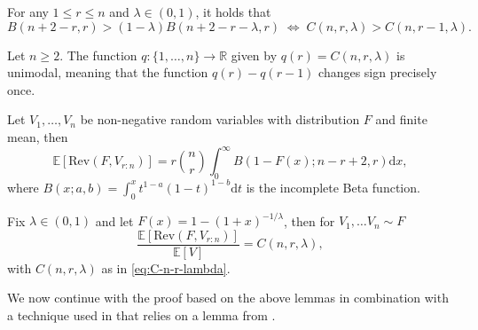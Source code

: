\documentclass[11pt]{article}
\newcommand{\E}{\mathbb{E}}
\newcommand{\dd}{\mathrm{d}}
\newcommand{\Rev}{\mathrm{Rev}}
\begin{document}
\begin{lemma}
    \label{lemma:constant-beta-equivalence}
    For any $1 \leq r \leq n$ and $\lambda \in (0,1)$, it holds that
    $$
    B(n+2-r,r) > (1-\lambda)B(n+2-r-\lambda,r) \; \iff \;  C(n,r,\lambda)>C(n,r-1,\lambda).
    $$
\end{lemma}

\begin{lemma}
    \label{lemma:C-unimodality}
    Let $n\ge 2$. The function $q:\{1,\dots,n\}\to \mathbb{R}$ given by $q(r)=C(n,r,\lambda)$ is unimodal, meaning that the function $q(r) - q(r-1)$ changes sign precisely once.
\end{lemma}

\begin{lemma}
    \label{lemma:order-statistic-beta}
    Let $V_1,\dots,V_n$ be non-negative random variables with distribution $F$ and finite mean, then
    $$
    \E[\Rev(F,V_{r:n})]=r\binom{n}{r}\int_0^\infty B(1-F(x); n-r+2,r)\dd x,
    $$
    where $B(x;a,b) = \int_0^x t^{1-a}(1-t)^{1-b}\mathrm{d}t$ is the incomplete Beta function. 
\end{lemma}

\begin{lemma}
    \label{lemma:const-gen-hazard-order-stat}
    Fix $\lambda\in(0,1)$ and let $F(x)=1-(1+x)^{-1/\lambda}$, then for $V_1,\dots V_n\sim F$
    $$
    \frac{\E[\Rev(F,V_{r:n})]}{\E[V]}=C(n,r,\lambda),
    $$
    with $C(n,r,\lambda)$ as in \eqref{eq:C-n-r-lambda}.
\end{lemma}
We now continue with the proof based on the above lemmas in combination with a technique used in \cite[Proposition 10]{schweizer2019performance} that relies on a lemma from \citet[Chapter 4, Lemma 7.1]{barlow1981statistical}.
\end{document}
